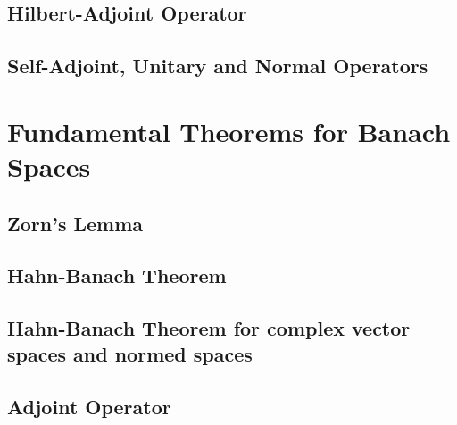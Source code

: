 \subsection{Hilbert-Adjoint Operator}
\subsection{Self-Adjoint, Unitary and Normal Operators}

\section{Fundamental Theorems for Banach Spaces}
\subsection{Zorn's Lemma}
\subsection{Hahn-Banach Theorem}
\subsection{Hahn-Banach Theorem for complex vector spaces and normed spaces}
\setcounter{subsection}{4}
\subsection{Adjoint Operator}
